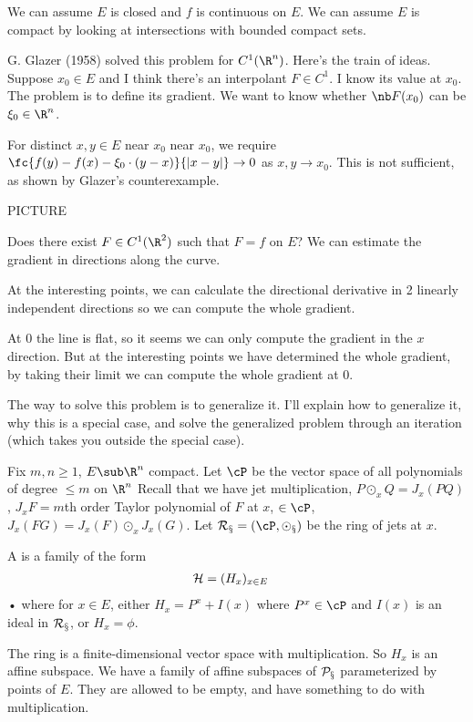 We can assume $E$ is closed and $f$ is continuous on $E$. %
We can assume $E$ is compact by looking at intersections with bounded compact sets.

G. Glazer (1958) solved this problem for $C^1(\R^n)$. Here's the train of ideas. Suppose $x_0\in E$ and I think there's an interpolant $F\in C^1$. I know its value at $x_0$. The problem is to define its gradient. We want to know whether $\nb F(x_0)$ can be $\xi_0\in \R^n$.

For distinct $x,y\in E$ near $x_0$ near $x_0$, we require $\fc{f(y)-f(x)-\xi_0\cdot (y-x)}{|x-y|}\to 0$ as $x,y\to x_0$. This is not sufficient, as shown by Glazer's counterexample. %

PICTURE

Does there exist $F\in C^1(\R^2)$ such that $F=f$ on $E$? We can estimate the gradient in directions along the curve. 

At the interesting points, we can calculate the directional derivative in 2 linearly independent directions so we can compute the whole gradient.

At 0 the line is flat, so it seems we can only compute the gradient in the $x$ direction. But at the interesting points we have determined the whole gradient, by taking their limit we can compute the whole gradient at 0.

The way to solve this problem is to generalize it. I'll explain how to generalize it, why this is a special case, and solve the generalized problem through an iteration (which takes you outside the special case). 

Fix $m,n\ge 1$, $E\sub \R^n$ compact. Let $\cP$ be the vector space of all polynomials of degree $\le m$ on $\R^n$ %
Recall that we have jet multiplication, $P\odot_x Q = J_x(PQ)$, $J_xF =m$th order Taylor polynomial of $F$ at $x$, $\in \cP$, $J_x(FG) = J_x(F)\odot_x J_x(G)$.  Let $\cal R_x=(\cP,\odot_x)$ be the ring of jets at $x$.

\begin{df}
A  is a family of the form 
\begin{align}
\cal H &= (H_x)_{x\in E}
\end{align}•
where for $x\in E$, either $H_x=P^x + I(x)$ where $P^x\in \cP$ and $I(x)$ is an ideal in $\cal R_x$, or $H_x=\phi$.
\end{df}
The ring is a finite-dimensional vector space with multiplication. So $H_x$ is an affine subspace. We have a family of affine subspaces of $\cal P_x$ parameterized by points of $E$. They are allowed to be empty, and have something to do with multiplication.

